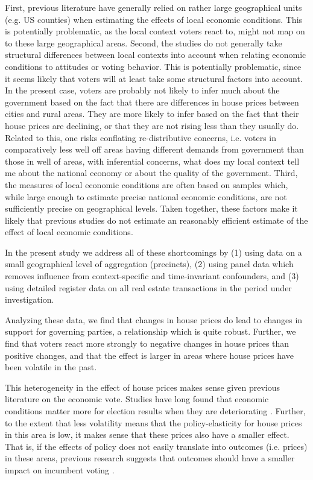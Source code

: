 \documentclass[12pt,a4paper]{article}
\begin{document}
First, previous literature have  generally relied on rather large geographical units (e.g. US counties) when estimating the effects of local economic conditions. This is potentially problematic, as the local context voters react to, might not map on to these large geographical areas. Second, the studies do not generally take structural differences between local contexts into account when relating economic conditions to  attitudes or voting behavior. This is potentially problematic, since it seems likely that voters will at least take some structural factors into account. In the present case, voters are probably not likely to infer much about the government based on the fact that there are differences in house prices between cities and rural areas. They are more likely to infer based on the fact that their house prices are declining, or that they are not rising less than they usually do. Related to this, one risks conflating re-distributive concerns, i.e. voters in comparatively less well off areas having different demands from government than those in well of areas, with inferential concerns, what does my local context tell me about the national economy or about the quality of the government. Third, the measures of local economic conditions are often based on samples which, while large enough to estimate precise national economic conditions, are not sufficiently precise on geographical levels. Taken together, these factors make it likely that previous studies do not estimate an reasonably efficient estimate of the effect of local economic conditions. 

In the present study we address all of these shortcomings by (1) using data on a small geographical level of aggregation (precincts), (2) using panel data which removes influence from context-specific and time-invariant confounders, and (3) using detailed register data on all real estate transactions in the period under investigation. 

Analyzing these data, we find that changes in house prices do lead to changes in support for governing parties, a relationship which is quite robust. Further, we find that voters react more strongly to negative changes in house prices than positive changes, and that the effect is larger in areas where house prices have been volatile in the past. 

This heterogeneity in the effect of house prices makes sense given previous literature on the economic vote. Studies have long found that economic conditions matter more for election results when they are deteriorating \citep[e.g.]{bloom1975voter,headrick1991attention,nannestad1997grievance}. Further, to the extent that less volatility means that the policy-elasticity for house prices in this area is low, it makes sense that these prices also have a smaller effect. That is, if the effects of policy does not easily translate into outcomes (i.e. prices) in these areas, previous research suggests that outcomes should have a smaller impact on incumbent voting \citep{duch2008economic}.
\end{document}
